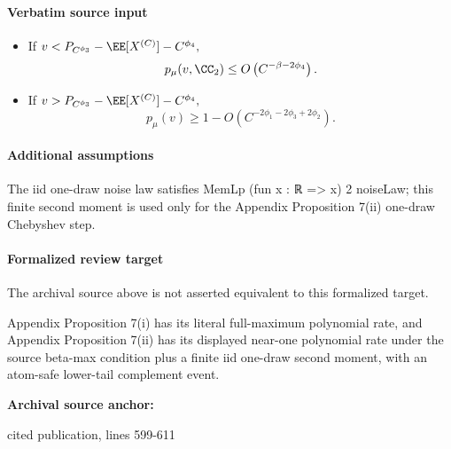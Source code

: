 \documentclass[10pt]{article}
\begin{document}
\paragraph{Verbatim source input}
\begin{ReviewVerbatim}
\begin{proposition}\label{prop:beet}
\quad
\begin{itemize}
    \item[(i)] If $v < P_{C^{\phi_3}} - \EE[X^{(C)}] - C^{\phi_4},$
    \begin{equation}
        p_\mu(v, \CC_2) \le O\left(C^{-\beta-2\phi_4}\right).
    \end{equation}
    \item[(ii)] If $v > P_{C^{\phi_3}} - \EE[X^{(C)}] - C^{\phi_4},$
    \begin{equation}
        p_\mu(v) \ge 1 - O\left(C^{-2\phi_1 - 2\phi_3 + 2\phi_2}\right).
    \end{equation}
\end{itemize}
\end{proposition}
\end{ReviewVerbatim}

\paragraph{Additional assumptions}
\begin{sloppypar}
The iid one-draw noise law satisfies MemLp (fun x : ℝ => x) 2 noiseLaw; this finite second moment is used only for the Appendix Proposition 7(ii) one-draw Chebyshev step.
\end{sloppypar}
\paragraph{Formalized review target}
The archival source above is not asserted equivalent to this formalized target.
\begin{ReviewVerbatim}
Appendix Proposition 7(i) has its literal full-maximum polynomial rate, and Appendix Proposition 7(ii) has its displayed near-one polynomial rate under the source beta-max condition plus a finite iid one-draw second moment, with an atom-safe lower-tail complement event.
\end{ReviewVerbatim}

\textbf{Archival source anchor:} {\footnotesize\raggedright cited publication, lines 599-\allowbreak{}611\par}
\end{document}

